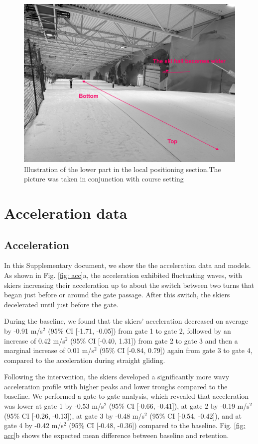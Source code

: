 \documentclass{article}
\begin{document}
\begin{figure}[H]
\centering
\includegraphics{figurer/figure_appendix_LPS_wide.jpg}
\caption{Illustration of the lower part in the local positioning section.The picture was taken in conjunction with course setting}\label{fig: lpsissues}
\end{figure}



\section{Acceleration data}

\subsection{Acceleration}
In this Supplementary document, we show the the acceleration data and models. As shown in Fig. \ref{fig: acc}a, the acceleration exhibited fluctuating waves, with skiers increasing their acceleration up to about the switch between two turns that began just before or around the gate passage. After this switch, the skiers decelerated until just before the gate. 

During the baseline, we found that the skiers' acceleration decreased on average by -0.91 m/s$^2$ (95\% CI [-1.71, -0.05]) from gate 1 to gate 2, followed by an increase of 0.42 m/s$^2$ (95\% CI [-0.40, 1.31]) from gate 2 to gate 3 and then a marginal increase of 0.01 m/s$^2$ (95\% CI [-0.84, 0.79]) again from gate 3 to gate 4, compared to the acceleration during straight gliding.

Following the intervention, the skiers developed a significantly more wavy acceleration profile with higher peaks and lower troughs compared to the baseline. We performed a gate-to-gate analysis, which revealed that acceleration was lower at gate 1 by -0.53  m/s$^2$ (95\% CI [-0.66, -0.41]), at gate 2 by -0.19  m/s$^2$ (95\% CI [-0.26, -0.13]), at gate 3 by -0.48  m/s$^2$ (95\% CI [-0.54, -0.42]), and at gate 4 by -0.42  m/s$^2$  (95\% CI [-0.48, -0.36]) compared to the baseline. Fig. \ref{fig: acc}b shows the expected mean difference between baseline and retention. 
\end{document}
